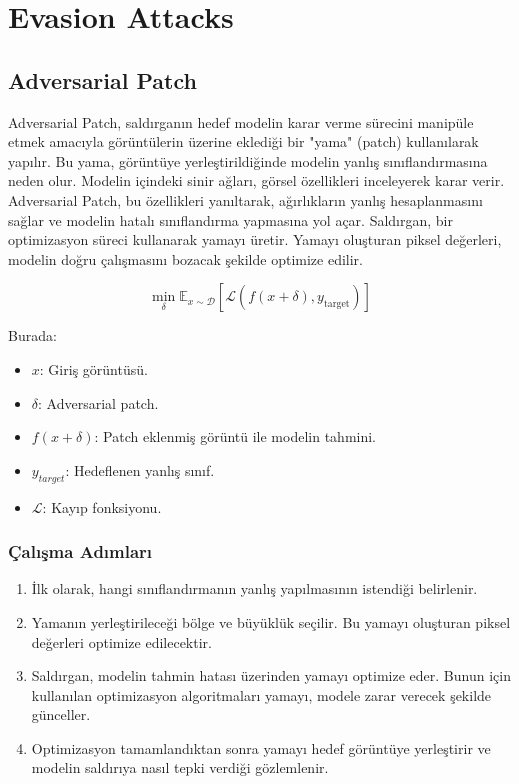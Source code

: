 \section{Evasion Attacks}

\subsection{Adversarial Patch}

Adversarial Patch, saldırganın hedef modelin karar verme sürecini manipüle etmek amacıyla görüntülerin üzerine eklediği bir "yama" (patch) kullanılarak yapılır. Bu yama, görüntüye yerleştirildiğinde modelin yanlış sınıflandırmasına neden olur. Modelin içindeki sinir ağları, görsel özellikleri inceleyerek karar verir. Adversarial Patch, bu özellikleri yanıltarak, ağırlıkların yanlış hesaplanmasını sağlar ve modelin hatalı sınıflandırma yapmasına yol açar. Saldırgan, bir optimizasyon süreci kullanarak yamayı üretir. Yamayı oluşturan piksel değerleri, modelin doğru çalışmasını bozacak şekilde optimize edilir.

\[ \min_{\delta} \mathbb{E}_{x \sim \mathcal{D}} \left[ \mathcal{L}(f(x + \delta), y_{\text{target}}) \right] \]

Burada:

\begin{itemize}
    \item $x$: Giriş görüntüsü.
    \item $\delta$: Adversarial patch.
    \item $f(x + \delta)$: Patch eklenmiş görüntü ile modelin tahmini.
    \item $y_{target}$: Hedeflenen yanlış sınıf.
    \item $\mathcal{L}$: Kayıp fonksiyonu.
\end{itemize}

\subsubsection{Çalışma Adımları}

\begin{enumerate}
    \item İlk olarak, hangi sınıflandırmanın yanlış yapılmasının istendiği belirlenir.
    \item Yamanın yerleştirileceği bölge ve büyüklük seçilir. Bu yamayı oluşturan piksel değerleri optimize edilecektir.
    \item Saldırgan, modelin tahmin hatası üzerinden yamayı optimize eder. Bunun için kullanılan optimizasyon algoritmaları yamayı, modele zarar verecek şekilde günceller.
    \item Optimizasyon tamamlandıktan sonra yamayı hedef görüntüye yerleştirir ve modelin saldırıya nasıl tepki verdiği gözlemlenir.
\end{enumerate}

